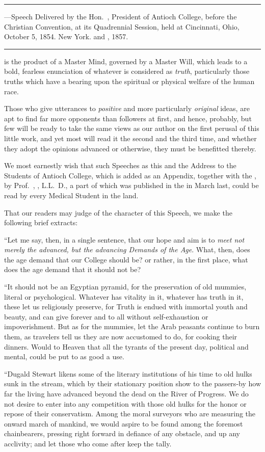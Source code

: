 
\fancybreak{* * *}
\footnotesize
{}---Speech Delivered by the Hon.~, President of
Antioch College, before the Christian Convention, at its Quadrennial Session, held at
Cincinnati, Ohio, October 5, 1854. New York.  and , 1857.
\plainbreak{1}
\normalsize

 is the product of a Master Mind, governed by a Master Will,
which leads to a bold, fearless enunciation of whatever is considered as
\emph{truth}, particularly those truths which have a bearing upon the spiritual
or physical welfare of the human race.

Those who give utterances to \emph{positive} and more particularly \emph{original}
ideas, are apt to find far more opponents than followers at first, and
hence, probably, but few will be ready to take the same views as our
author on the first perusal of this little work, and yet most will read it
the second and the third time, and whether they adopt the opinions
advanced or otherwise, they must be benefitted thereby.

We most earnestly wish that such Speeches as this and the Address
to the Students of Antioch College, which is added as an Appendix,
together with the , by Prof.~, \md, L.L.~D., a part of which was
published in the  in March last, could be read by every
Medical Student in the land.

That our readers may judge of the character of this Speech, we
make the following brief extracts:

``Let me say, then, in a single sentence, that our hope and aim is to
\emph{meet not merely the advanced, but the advancing Demands of the Age}.
What, then, does the age demand that our College should be? or rather,
in the first place, what does the age demand that it should not be?

``It should not be an Egyptian pyramid, for the preservation of old
mummies, literal or psychological. Whatever has vitality in it, whatever
has truth in it, these let us religiously preserve, for Truth is endued
with immortal youth and beauty, and can give forever and to all without
self-exhaustion or impoverishment. But as for the mummies, let
the Arab peasants continue to burn them, as travelers tell us they are
now accustomed to do, for cooking their dinners. Would to Heaven
that all the tyrants of the present day, political and mental, could be
put to as good a use.

``Dugald Stewart likens some of the literary institutions of his time
to old hulks sunk in the stream, which by their stationary position
show to the passers-by how far the living have advanced beyond the
dead on the River of Progress. We do not desire to enter into any
competition with those old hulks for the honor or repose of their conservatism.
Among the moral surveyors who are measuring the onward
march of mankind, we would aspire to be found among the foremost
chainbearers, pressing right forward in defiance of any obstacle, and
up any acclivity; and let those who come after keep the tally.\endinput
